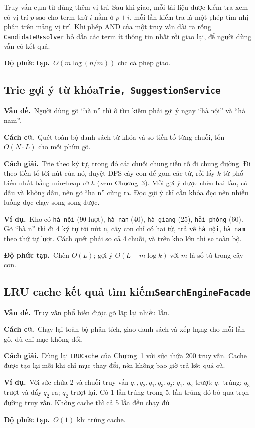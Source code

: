 \documentclass[9pt,twocolumn,a4paper]{extarticle}
\newcommand{\code}[1]{\texttt{#1}}
\newcommand{\dsa}[2]{\subsection[#1]{#1\hfill{\normalfont\footnotesize\code{#2}}}}
\newcommand{\vande}{\textcolor{linkblue}{\textbf{Vấn đề.}}~}
\newcommand{\cachgiai}{\textcolor{linkblue}{\textbf{Cách giải.}}~}
\newcommand{\dpt}{\textcolor{linkblue}{\textbf{Độ phức tạp.}}~}
\newcommand{\cu}{\textcolor{linkblue}{\textbf{Cách cũ.}}~}
\newcommand{\vidu}{\textcolor{linkblue}{\textbf{Ví dụ.}}~}
\begin{document}
Truy vấn cụm từ dùng thêm vị trí. Sau khi giao, mỗi tài liệu được kiểm tra xem có vị trí $p$ sao cho term thứ $i$ nằm ở $p+i$, mỗi lần kiểm tra là một phép tìm nhị phân trên mảng vị trí. Khi phép AND của một truy vấn dài ra rỗng, \code{CandidateResolver} bỏ dần các term ít thông tin nhất rồi giao lại, để người dùng vẫn có kết quả.

\dpt $O(m\log(n/m))$ cho cả phép giao.

\dsa{Trie gợi ý từ khóa}{Trie, SuggestionService}
\vande Người dùng gõ ``hà n'' thì ô tìm kiếm phải gợi ý ngay ``hà nội'' và ``hà nam''.

\cu Quét toàn bộ danh sách từ khóa và so tiền tố từng chuỗi, tốn $O(N\cdot L)$ cho mỗi phím gõ.

\cachgiai Trie theo ký tự, trong đó các chuỗi chung tiền tố đi chung đường. Đi theo tiền tố tới nút của nó, duyệt DFS cây con để gom các từ, rồi lấy $k$ từ phổ biến nhất bằng min-heap cỡ $k$ (xem Chương~3). Mỗi gợi ý được chèn hai lần, có dấu và không dấu, nên gõ ``ha n'' cũng ra. Đọc gợi ý chỉ cần khóa đọc nên nhiều luồng đọc chạy song song được.

\vidu Kho có \code{hà nội} (90 lượt), \code{hà nam} (40), \code{hà giang} (25), \code{hải phòng} (60). Gõ ``hà n'' thì đi 4 ký tự tới nút \code{n}, cây con chỉ có hai từ, trả về \code{hà nội}, \code{hà nam} theo thứ tự lượt. Cách quét phải so cả 4 chuỗi, và trên kho lớn thì so toàn bộ.

\dpt Chèn $O(L)$; gợi ý $O(L+m\log k)$ với $m$ là số từ trong cây con.

\dsa{LRU cache kết quả tìm kiếm}{SearchEngineFacade}
\vande Truy vấn phổ biến được gõ lặp lại nhiều lần.

\cu Chạy lại toàn bộ phân tích, giao danh sách và xếp hạng cho mỗi lần gõ, dù chỉ mục không đổi.

\cachgiai Dùng lại \code{LRUCache} của Chương~1 với sức chứa 200 truy vấn. Cache được tạo lại mỗi khi chỉ mục thay đổi, nên không bao giờ trả kết quả cũ.

\vidu Với sức chứa 2 và chuỗi truy vấn $q_1,q_2,q_1,q_3,q_2$: $q_1$, $q_2$ trượt; $q_1$ trúng; $q_3$ trượt và đẩy $q_2$ ra; $q_2$ trượt lại. Có 1 lần trúng trong 5, lần trúng đó bỏ qua trọn đường truy vấn. Không cache thì cả 5 lần đều chạy đủ.

\dpt $O(1)$ khi trúng cache.
\end{document}
